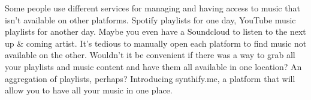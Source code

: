 Some people use different services for managing and having access to music that isn't available on other platforms. Spotify playlists for one day, YouTube music playlists for another day. Maybe you even have a Soundcloud to listen to the next up \& coming artist. It’s tedious to manually open each platform to find music not available on the other. Wouldn't it be convenient if there was a way to grab all your playlists and music content and have them all available in one location? An aggregation of playlists, perhaps? Introducing synthify.me, a platform that will allow you to have all your music in one place.
